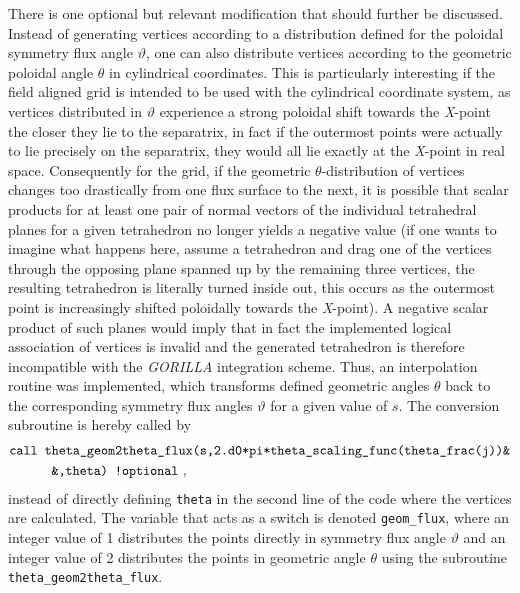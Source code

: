 \documentclass[./main.tex]{subfiles}
\begin{document}
There is one optional but relevant modification that should further be discussed. Instead of generating vertices according to a distribution defined for the poloidal symmetry flux angle $\vartheta$, one can also distribute vertices according to the geometric poloidal angle $\theta$ in cylindrical coordinates. This is particularly interesting if the field aligned grid is intended to be used with the cylindrical coordinate system, as vertices distributed in $\vartheta$ experience a strong poloidal shift towards the \textit{X}-point the closer they lie to the separatrix, in fact if the outermost points were actually to lie precisely on the separatrix, they would all lie exactly at the \textit{X}-point in real space. Consequently for the grid, if the geometric $\theta$-distribution of vertices changes too drastically from one flux surface to the next, it is possible that scalar products for at least one pair of normal vectors of the individual tetrahedral planes for a given tetrahedron no longer yields a negative value (if one wants to imagine what happens here, assume a tetrahedron and drag one of the vertices through the opposing plane spanned up by the remaining three vertices, the resulting tetrahedron is literally turned inside out, this occurs as the outermost point is increasingly shifted poloidally towards the \textit{X}-point). A negative scalar product of such planes would imply that in fact the implemented logical association of vertices is invalid and the generated tetrahedron is therefore incompatible with the \textit{GORILLA} integration scheme. Thus, an interpolation routine was implemented, which transforms defined geometric angles $\theta$ back to the corresponding symmetry flux angles $\vartheta$ for a given value of $s$. The conversion subroutine is hereby called by
\begin{align*}
&\texttt{call theta\_geom2theta\_flux(s,2.d0*pi*theta\_scaling\_func(theta\_frac(j))\&}\\
&\hspace{1.1cm}\texttt{\&,theta) !optional}~,
\end{align*}
instead of directly defining \texttt{theta} in the second line of the code where the vertices are calculated. The variable that acts as a switch is denoted \texttt{geom\_flux}, where an integer value of 1 distributes the points directly in symmetry flux angle $\vartheta$ and an integer value of 2 distributes the points in geometric angle $\theta$ using the subroutine \texttt{theta\_geom2theta\_flux}.
\end{document}
